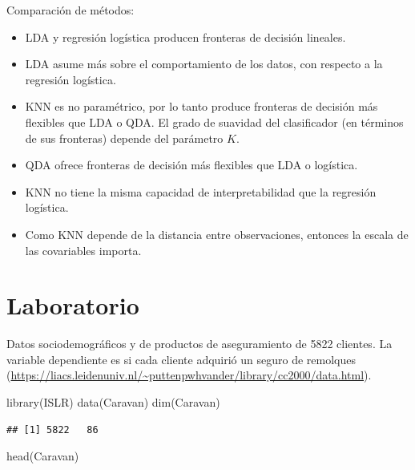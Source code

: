 \documentclass[
  12pt,
]{book}
\newenvironment{Shaded}{\begin{snugshade}}{\end{snugshade}}
\newcommand{\FunctionTok}[1]{\textcolor[rgb]{0.00,0.00,0.00}{#1}}
\newcommand{\NormalTok}[1]{#1}
\providecommand{\tightlist}{%
  \setlength{\itemsep}{0pt}\setlength{\parskip}{0pt}}
\theoremstyle{definition}
\theoremstyle{definition}
\theoremstyle{definition}
\theoremstyle{definition}
\theoremstyle{remark}
\begin{document}
Comparación de métodos:

\begin{itemize}
\tightlist
\item
  LDA y regresión logística producen fronteras de decisión lineales.
\item
  LDA asume más sobre el comportamiento de los datos, con respecto a la regresión logística.
\item
  KNN es no paramétrico, por lo tanto produce fronteras de decisión más flexibles que LDA o QDA. El grado de suavidad del clasificador (en términos de sus fronteras) depende del parámetro \(K\).
\item
  QDA ofrece fronteras de decisión más flexibles que LDA o logística.
\item
  KNN no tiene la misma capacidad de interpretabilidad que la regresión logística.
\item
  Como KNN depende de la distancia entre observaciones, entonces la escala de las covariables importa.
\end{itemize}

\hypertarget{laboratorio-7}{%
\section{Laboratorio}\label{laboratorio-7}}

Datos sociodemográficos y de productos de aseguramiento de 5822 clientes. La variable dependiente es si cada cliente adquirió un seguro de remolques (\url{https://liacs.leidenuniv.nl/~puttenpwhvander/library/cc2000/data.html}).

\begin{Shaded}
\begin{Highlighting}[]
\FunctionTok{library}\NormalTok{(ISLR)}
\FunctionTok{data}\NormalTok{(Caravan)}
\FunctionTok{dim}\NormalTok{(Caravan)}
\end{Highlighting}
\end{Shaded}

\begin{verbatim}
## [1] 5822   86
\end{verbatim}

\begin{Shaded}
\begin{Highlighting}[]
\FunctionTok{head}\NormalTok{(Caravan)}
\end{Highlighting}
\end{Shaded}
\end{document}
